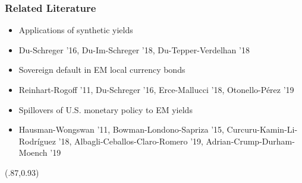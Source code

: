 \documentclass[12pt, aspectratio=169, xcolor=dvipsnames]{beamer}  %
\begin{document}
\begin{frame}[label=LitReview]
\frametitle{Related Literature}
\begin{itemize}
	\item Applications of synthetic yields
	\vspace{-3mm}
	\item[] {\footnotesize Du-Schreger '16, Du-Im-Schreger '18, Du-Tepper-Verdelhan '18}
	\item Sovereign default in EM local currency bonds
	\vspace{-3mm}
	\item[] {\footnotesize Reinhart-Rogoff '11, Du-Schreger '16, Erce-Mallucci '18, Otonello-Pérez '19}
	\item Spillovers of U.S. monetary policy to EM yields
	\vspace{-3mm}
	\item[] {\footnotesize Hausman-Wongswan '11, Bowman-Londono-Sapriza '15, Curcuru-Kamin-Li-Rodríguez '18, Albagli-Ceballos-Claro-Romero '19, Adrian-Crump-Durham-Moench '19}
\end{itemize}
\begin{textblock*}{3cm}(.87\textwidth,0.93\textheight)
\hyperlink{Contributions}{}
\end{textblock*}
\end{frame}
\end{document}
